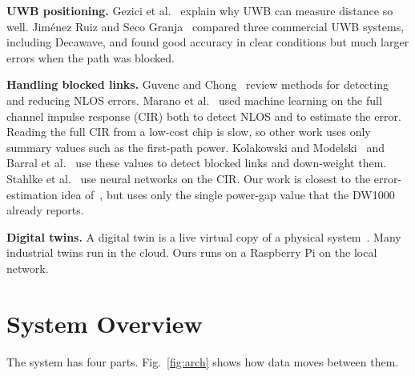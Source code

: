 \documentclass[conference]{IEEEtran}
\begin{document}
\textbf{UWB positioning.} Gezici et al.~\cite{gezici2005localization}
explain why UWB can measure distance so well. Jim\'enez Ruiz and Seco
Granja~\cite{jimenez2017comparing} compared three commercial UWB systems,
including Decawave, and found good accuracy in clear conditions but much
larger errors when the path was blocked.

\textbf{Handling blocked links.} Guvenc and Chong~\cite{guvenc2009survey}
review methods for detecting and reducing NLOS errors. Marano et
al.~\cite{marano2010nlos} used machine learning on the full channel
impulse response (CIR) both to detect NLOS and to estimate the error.
Reading the full CIR from a low-cost chip is slow, so other work uses only
summary values such as the first-path power. Kolakowski and
Modelski~\cite{kolakowski2017first} and Barral et al.~\cite{barral2019nlos}
use these values to detect blocked links and down-weight them. Stahlke et
al.~\cite{stahlke2020nlos} use neural networks on the CIR. Our work is
closest to the error-estimation idea of~\cite{marano2010nlos}, but uses
only the single power-gap value that the DW1000 already reports.

\textbf{Digital twins.} A digital twin is a live virtual copy of a
physical system~\cite{grieves2017digital,tao2019digital}. Many industrial
twins run in the cloud. Ours runs on a Raspberry Pi on the local network.

\section{System Overview}
The system has four parts. Fig.~\ref{fig:arch} shows how data moves
between them.
\end{document}
